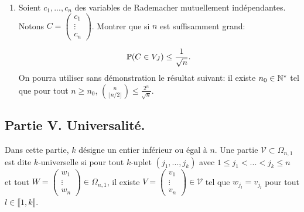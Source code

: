 \begin{enumerate}
\begin{enumerate}
 \item Soient $c_{1}, ..., c_{n}$ des variables de Rademacher mutuellement indépendantes. Notons $C = \begin{pmatrix}
                                                                                                       c_{1}\\
                                                                                                       \vdots \\
                                                                                                       c_{n}
                                                                                                      \end{pmatrix}$. Montrer que si $n$ est suffisamment grand:

 \[ \mathbb{P} (C\in V_{J}) \leq \frac{1}{\sqrt{n}}.\]
 On pourra utiliser sans démonstration le résultat suivant: il existe $n_{0}\in \mathbb{N}^{*}$ tel que pour tout $n\geq n_{0}$, $\displaystyle{\binom{n}{\lfloor n/2\rfloor}\leq \frac{2^{n}}{\sqrt{n}}}$.  

\end{enumerate}
\end{enumerate}

\subsection*{Partie V. Universalité.}
Dans cette partie, $k$ désigne un entier inférieur ou égal à $n$. Une partie $\mathcal{V}\subset \Omega_{n,1}$ est dite $k$-universelle si pour tout $k$-uplet $(j_{1}, ..., j_{k})$ avec  $1\leq j_{1} < ... < j_{k}\leq n$ et tout 
$W = \begin{pmatrix} w_{1}\\ \vdots \\ w_{n} \end{pmatrix} \in \Omega_{n,1}$, il existe 
$V = \begin{pmatrix} v_{1}\\ \vdots\\ v_{n}\end{pmatrix} \in \mathcal{V}$
tel que $w_{j_{l}} = v_{j_{l}}$ pour tout $l\in \llbracket 1, k\rrbracket$. 

